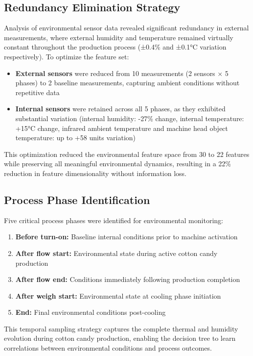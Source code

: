 \subsection{Redundancy Elimination Strategy}


Analysis of environmental sensor data revealed significant redundancy in external measurements, where external humidity and temperature remained virtually constant throughout the production process (±0.4\% and ±0.1°C variation respectively). To optimize the feature set:

\begin{itemize}
    \item \textbf{External sensors} were reduced from 10 measurements (2 sensors × 5 phases) to 2 baseline measurements, capturing ambient conditions without repetitive data
    \item \textbf{Internal sensors} were retained across all 5 phases, as they exhibited substantial variation (internal humidity: -27\% change, internal temperature: +15°C change, infrared ambient temperature and machine head object temperature: up to +58 units variation)
\end{itemize}

This optimization reduced the environmental feature space from 30 to 22 features while preserving all meaningful environmental dynamics, resulting in a 22\% reduction in feature dimensionality without information loss.

\subsection{Process Phase Identification}

Five critical process phases were identified for environmental monitoring:

\begin{enumerate}
    \item \textbf{Before turn-on:} Baseline internal conditions prior to machine activation
    \item \textbf{After flow start:} Environmental state during active cotton candy production
    \item \textbf{After flow end:} Conditions immediately following production completion
    \item \textbf{After weigh start:} Environmental state at cooling phase initiation
    \item \textbf{End:} Final environmental conditions post-cooling
\end{enumerate}

This temporal sampling strategy captures the complete thermal and humidity evolution during cotton candy production, enabling the decision tree to learn correlations between environmental conditions and process outcomes.
